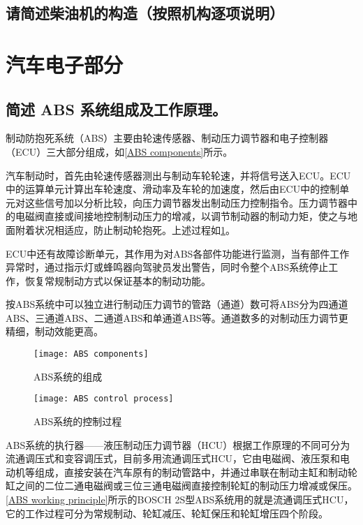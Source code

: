 \documentclass[UTF8]{ctexart}
\numberwithin{figure}{section}
\numberwithin{table}{section}
\begin{document}
\subsection{请简述柴油机的构造（按照机构逐项说明）}
\newpage

\section{汽车电子部分}
\subsection{简述 ABS 系统组成及工作原理。}

制动防抱死系统（ABS）主要由轮速传感器、制动压力调节器和电子控制器（ECU）三大部分组成，如\cref{ABS components}所示。

汽车制动时，首先由轮速传感器测出与制动车轮轮速，并将信号送入ECU。ECU中的运算单元计算出车轮速度、滑动率及车轮的加速度，然后由ECU中的控制单元对这些信号加以分析比较，向压力调节器发出制动压力控制指令。压力调节器中的电磁阀直接或间接地控制制动压力的增减，以调节制动器的制动力矩，使之与地面附着状况相适应，防止制动轮抱死。上述过程如\cref{ABS control process}。

ECU中还有故障诊断单元，其作用为对ABS各部件功能进行监测，当有部件工作异常时，通过指示灯或蜂鸣器向驾驶员发出警告，同时令整个ABS系统停止工作，恢复常规制动方式以保证基本的制动功能。

按ABS系统中可以独立进行制动压力调节的管路（通道）数可将ABS分为四通道ABS、三通道ABS、二通道ABS和单通道ABS等。通道数多的对制动压力调节更精细，制动效能更高。

\begin{figure}[htbp]
	\centering
	\begin{minipage}[b]{0.8\textwidth}
		\centering
		\texttt{[image: ABS components]}
		\caption{ABS系统的组成}
		\label{ABS components}
	\end{minipage}
	\begin{minipage}[b]{0.8\textwidth}
		\centering
		\texttt{[image: ABS control process]}
		\caption{ABS系统的控制过程}
		\label{ABS control process}
	\end{minipage}
\end{figure}

ABS系统的执行器——液压制动压力调节器（HCU）根据工作原理的不同可分为流通调压式和变容调压式，目前多用流通调压式HCU，它由电磁阀、液压泵和电动机等组成，直接安装在汽车原有的制动管路中，并通过串联在制动主缸和制动轮缸之间的二位二通电磁阀或三位三通电磁阀直接控制轮缸的制动压力增减或保压。\cref{ABS working principle}所示的BOSCH 2S型ABS系统用的就是流通调压式HCU，它的工作过程可分为常规制动、轮缸减压、轮缸保压和轮缸增压四个阶段。
\end{document}
